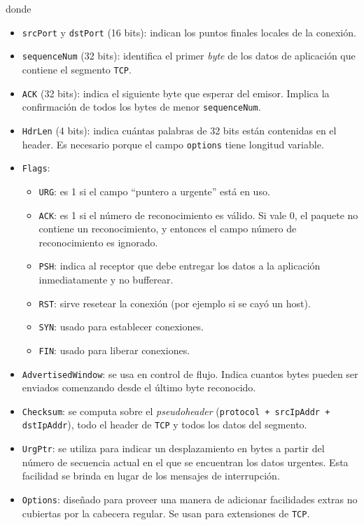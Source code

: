 \documentclass[]{article}
\begin{document}

donde
\begin{itemize}
    \item \texttt{srcPort} y \texttt{dstPort} (16 bits): indican los puntos finales locales de la conexión.
    \item \texttt{sequenceNum} (32 bits): identifica el primer \emph{byte} de los datos de aplicación que contiene el segmento \texttt{TCP}.
    \item \texttt{ACK} (32 bits): indica el siguiente byte que esperar del emisor. Implica la confirmación de todos los bytes de menor \texttt{sequenceNum}.
    \item \texttt{HdrLen} (4 bits): indica cuántas palabras de 32 bits están contenidas en el header. Es necesario porque el campo \texttt{options} tiene longitud variable.
    \item \texttt{Flags}:
    \begin{itemize}
        \item \texttt{URG}: es 1 si el campo ``puntero a urgente'' está en uso.
        \item \texttt{ACK}: es 1 si el número de reconocimiento es válido. Si vale 0, el paquete no contiene un reconocimiento, y entonces el campo número de reconocimiento es ignorado.
        \item \texttt{PSH}: indica al receptor que debe entregar los datos a la aplicación inmediatamente y no bufferear.
        \item \texttt{RST}: sirve resetear la conexión (por ejemplo si se cayó un host).
        \item \texttt{SYN}: usado para establecer conexiones.
        \item \texttt{FIN}: usado para liberar conexiones.
    \end{itemize}
    \item \texttt{AdvertisedWindow}: se usa en control de flujo. Indica cuantos bytes pueden ser enviados comenzando desde el último byte reconocido.
    \item \texttt{Checksum}: se computa sobre el \emph{pseudoheader} (\texttt{protocol + srcIpAddr + dstIpAddr}), todo el header de \texttt{TCP} y todos los datos del segmento.
    \item \texttt{UrgPtr}: se utiliza para indicar un desplazamiento en bytes a partir del número de secuencia actual en el que se encuentran los datos urgentes. Esta facilidad se brinda en lugar de los mensajes de interrupción.
    \item \texttt{Options}: diseñado para proveer una manera de adicionar facilidades extras no cubiertas por la cabecera regular. Se usan para extensiones de \texttt{TCP}.
\end{itemize}
\end{document}
